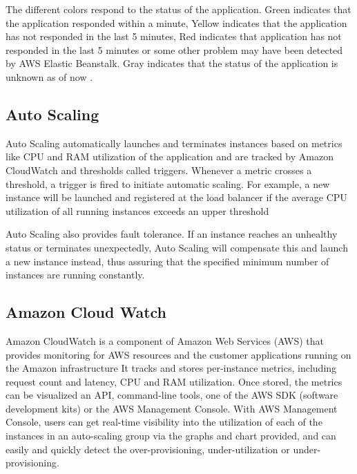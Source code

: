 \documentclass[9pt,twocolumn,twoside]{../../styles/osajnl}
\begin{document}
The different colors respond to the status of the application. Green
indicates that the application responded within a minute, Yellow
indicates that the application has not responded in the last 5
minutes, Red indicates that application has not responded in the last
5 minutes or some other problem may have been detected by AWS Elastic
Beanstalk. Gray indicates that the status of the application is
unknown as of now \cite{elastic-loadbalancing}.


\subsection{Auto Scaling}

Auto Scaling automatically launches and terminates instances based on
metrics like CPU and RAM utilization of the application and are
tracked by Amazon CloudWatch and thresholds called triggers. Whenever
a metric crosses a threshold, a trigger is fired to initiate automatic
scaling.  For example, a new instance will be launched and registered
at the load balancer if the average CPU utilization of all running
instances exceeds an upper threshold
    
Auto Scaling also provides fault tolerance. If an instance reaches an
unhealthy status or terminates unexpectedly, Auto Scaling will
compensate this and launch a new instance instead, thus assuring that
the specified minimum number of instances are running constantly.


\subsection{Amazon Cloud Watch}

Amazon CloudWatch is a component of Amazon Web Services (AWS) that
provides monitoring for AWS resources and the customer applications
running on the Amazon infrastructure \cite{elastic-cloudwatch}  It tracks and stores
per-instance metrics, including request count and latency, CPU and RAM
utilization.  Once stored, the metrics can be visualized an API,
command-line tools, one of the AWS SDK (software development kits) or
the AWS Management Console. With AWS Management Console, users can
get real-time visibility into the utilization of each of the instances
in an auto-scaling group via the graphs and chart provided, and can
easily and quickly detect the over-provisioning, under-utilization or
under-provisioning.
\end{document}
